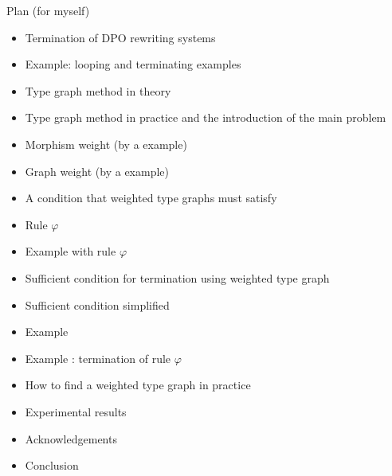 \documentclass{beamer}
\begin{document}
\begin{frame}{Plan (for myself)}
  \begin{itemize}
    \item Termination of DPO rewriting systems
    \item Example: looping and terminating examples
    \item Type graph method in theory 
    \item Type graph method in practice and the introduction of the main problem
    \item Morphism weight (by a example)
    \item Graph weight (by a example)
    \item A condition that weighted type graphs must satisfy
    \item Rule $\varphi$
    \item Example with rule $\varphi$
    \item Sufficient condition for termination using weighted type graph
    \item Sufficient condition simplified
    \item Example
    \item Example : termination of rule $\varphi$
    \item How to find a weighted type graph in practice
    \item Experimental results
    \item Acknowledgements
    \item Conclusion
  \end{itemize}
\end{frame}
\end{document}
